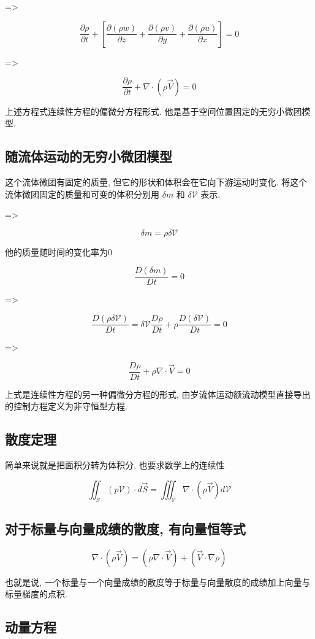 =>

$$
	\frac{\partial \rho}{\partial t}  + [\frac{\partial (\rho w)}{\partial z} + \frac{\partial (\rho v)}{\partial y} + \frac{\partial (\rho u)}{\partial x} ] = 0
$$

=>

$$
	\frac{\partial \rho}{\partial t} + \nabla \cdot (\rho \vec{V}) = 0
$$

上述方程式连续性方程的偏微分方程形式. 他是基于空间位置固定的无穷小微团模型.

\subsection{随流体运动的无穷小微团模型}
这个流体微团有固定的质量, 但它的形状和体积会在它向下游运动时变化. 将这个流体微团固定的质量和可变的体积分别用 $\delta m$ 和 $\delta \mathcal{V}$ 表示.

=>

$$
	\delta m = \rho \delta \mathcal{V}
$$

他的质量随时间的变化率为0

$$
	\frac{D(\delta m)}{Dt} = 0
$$

=>

$$
	\frac{D(\rho \delta \mathcal{V})}{Dt} = \delta \mathcal{V} \frac{D\rho}{Dt} + \rho \frac{D(\delta \mathcal{V})}{Dt} = 0
$$

=>

$$
	\frac{D\rho}{Dt} + \rho \nabla \cdot \vec{V} = 0
$$

上式是连续性方程的另一种偏微分方程的形式, 由岁流体运动额流动模型直接导出的控制方程定义为非守恒型方程.

\subsection{散度定理}
简单来说就是把面积分转为体积分, 也要求数学上的连续性

$$
	\iint_{S}(p\mathcal{V})\cdot d\vec{S} = \iiint_{\mathcal{V}} \nabla \cdot (\rho \vec{V}) d \mathcal{V}
$$
\subsection{对于标量与向量成绩的散度, 有向量恒等式}

$$
	\nabla \cdot (\rho \vec{V}) = (\rho \nabla \cdot \vec{V}) + (\vec{V} \cdot \nabla \rho)
$$

也就是说, 一个标量与一个向量成绩的散度等于标量与向量散度的成绩加上向量与标量梯度的点积.
\subsection{动量方程}

